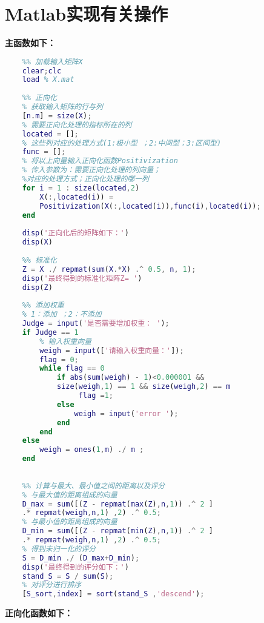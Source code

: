\documentclass{article}
\begin{document}
\section{Matlab实现有关操作}
\textbf{主函数如下：}
\begin{lstlisting}[language=Matlab]
    %% topsis
    %% 加载输入矩阵X
    clear;clc
    load % X.mat
    
    %% 正向化
    % 获取输入矩阵的行与列
    [n.m] = size(X);
    % 需要正向化处理的指标所在的列
    located = [];
    % 这些列对应的处理方式(1:极小型 ；2:中间型；3:区间型)
    func = [];
    % 将以上向量输入正向化函数Positivization
    % 传入参数为：需要正向化处理的列向量；
    %对应的处理方式；正向化处理的哪一列
    for i = 1 : size(located,2)
        X(:,located(i)) = 
        Positivization(X(:,located(i)),func(i),located(i));
    end
    
    disp('正向化后的矩阵如下：')
    disp(X)
    
    %% 标准化
    Z = X ./ repmat(sum(X.*X) .^ 0.5, n, 1);
    disp('最终得到的标准化矩阵Z= ')
    disp(Z)
    
    %% 添加权重
    % 1：添加 ；2：不添加
    Judge = input('是否需要增加权重： '); 
    if Judge == 1
        % 输入权重向量
        weigh = input(['请输入权重向量：']);
        flag = 0;  
        while flag == 0 
            if abs(sum(weigh) - 1)<0.000001 && 
            size(weigh,1) == 1 && size(weigh,2) == m   
                 flag =1;
            else
                weigh = input('error ');
            end
        end
    else
        weigh = ones(1,m) ./ m ; 
    end
    
    
    %% 计算与最大、最小值之间的距离以及评分
    % 与最大值的距离组成的向量
    D_max = sum([(Z - repmat(max(Z),n,1)) .^ 2 ] 
    .* repmat(weigh,n,1) ,2) .^ 0.5;
    % 与最小值的距离组成的向量
    D_min = sum([(Z - repmat(min(Z),n,1)) .^ 2 ] 
    .* repmat(weigh,n,1) ,2) .^ 0.5;
    % 得到未归一化的评分
    S = D_min ./ (D_max+D_min); 
    disp('最终得到的评分如下：')
    stand_S = S / sum(S);
    % 对评分进行排序
    [S_sort,index] = sort(stand_S ,'descend');


\end{lstlisting} 
\textbf{正向化函数如下：}
\end{document}
